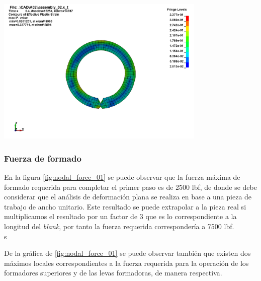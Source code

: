 \begin{center}
\includegraphics[width=0.75\textwidth]{src/ch4/efective_plastic_strain_02.png}
\label{fig:efective_plastic_strain_02}
\end{center}




\subsubsection{Fuerza de formado}

En la figura \ref{fig:nodal_force_01} se puede observar que la fuerza máxima de formado 
requerida para completar el primer paso es de 2500 lbf, de donde se debe considerar 
que el análisis de deformación plana se realiza en base a una pieza de trabajo de 
ancho unitario. Este resultado se puede extrapolar a la pieza real si multiplicamos el 
resultado por un factor de 3 que es lo correspondiente a la longitud del \textit{blank}, 
por tanto la fuerza requerida correspondería a 7500 lbf.\\s

De la gráfica de \ref{fig:nodal_force_01} se puede observar también que existen dos máximos 
locales correspondientes a la fuerza requerida para la operación de los formadores superiores y 
de las levas formadoras, de manera respectiva.\\


